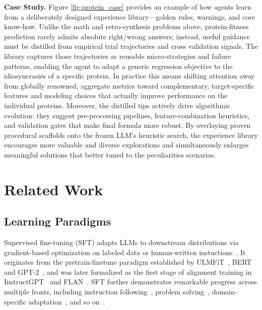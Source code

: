 \documentclass{article}
\begin{document}
\textbf{Case Study.} Figure \ref{fig:protein_case} provides an example of how agents learn from a deliberately designed experience library—golden rules, warnings, and core know-how. Unlike the math and retro-synthesis problems above, protein-fitness prediction rarely admits absolute right/wrong answers; instead, useful guidance must be distilled from empirical trial trajectories and cross validation signals. The library captures those trajectories as reusable micro-strategies and failure patterns, enabling the agent to adapt a generic regression objective to the idiosyncrasies of a specific protein. In practice this means shifting attention away from globally renowned, aggregate metrics toward complementary, target-specific features and modeling choices that actually improve performance on the individual proteins.
Moreover, the distilled tips actively drive algorithmic evolution: they suggest pre-processing pipelines, feature-combination heuristics, and validation gates that make final formula more robust. By overlaying proven procedural scaffolds onto the frozen LLM’s heuristic search, the experience library encourages more valuable and diverse explorations and simultaneously enlarges meaningful solutions that better tuned to the peculiarities scenarios.



\section{Related Work}
\subsection{Learning Paradigms}
Supervised fine-tuning (SFT) adapts LLMs to downstream distributions via gradient-based optimization on labeled data or human-written instuctions~\cite{howard2018universal,devlin2019bert,radford2019language,raffel2020exploring}.
It originates from the pretrain-finetune paradigm established by ULMFiT~\cite{howard2018universal}, BERT~\cite{devlin2019bert} and GPT-2~\cite{radford2019language}, and was later formalized as the first stage of alignment training in InstructGPT~\cite{ouyang2022training} and FLAN~\cite{wei2021finetuned}.
SFT further demonstrates remarkable progress across multiple fronts, including instruction following~\cite{ouyang2022training,sanh2021multitask,wei2021finetuned}, problem solving~\cite{toshniwal2024openmathinstruct,ahn2024large,luo2023wizardmath}, domain-specific adaptation~\cite{luo2022biogpt,zhang2024chemllm,liu2023fingpt,zhou2024lawgpt}, and so on~\cite{chen2021evaluating,roziere2023code,li2023starcoder,fried2022incoder}.
\end{document}
